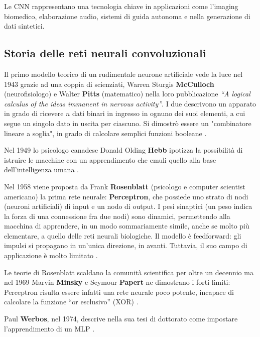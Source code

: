 Le CNN rappresentano una tecnologia chiave in applicazioni come l'imaging biomedico, elaborazione audio, sistemi di guida autonoma e nella generazione di dati sintetici.

\subsection{Storia delle reti neurali convoluzionali}
Il primo modello teorico di un rudimentale neurone artificiale vede la luce nel 1943 grazie ad una coppia di scienziati, Warren Sturgis \textbf{McCulloch} (neurofisiologo) e Walter \textbf{Pitts} (matematico) nella loro pubblicazione \textit{“A logical calculus of the ideas immanent in nervous activity”}. 
I due descrivono un apparato in grado di ricevere \(n\) dati binari in ingresso in ognuno dei suoi elementi, a cui segue un singolo dato in uscita per ciascuno. Si dimostrò essere un "combinatore lineare a soglia", in grado di calcolare semplici funzioni booleane \cite{ai4b_reti_neurali, ia_reti_neurali}.

Nel 1949 lo psicologo canadese Donald Olding \textbf{Hebb} ipotizza la possibilità di istruire le macchine con un apprendimento che emuli quello alla base dell’intelligenza umana \cite{ia_reti_neurali}.

Nel 1958 viene proposta da Frank \textbf{Rosenblatt} (psicologo e computer scientist americano) la prima rete neurale: \textbf{Perceptron}, che possiede uno strato di nodi (neuroni artificiali) di input e un nodo di output.
I pesi sinaptici (un peso indica la forza di una connessione fra due nodi) sono dinamici, permettendo alla macchina di apprendere, in un modo sommariamente simile, anche se molto più elementare, a quello delle reti neurali biologiche. Il modello è feedforward: gli impulsi si propagano in un’unica direzione, in avanti. Tuttavia, il suo campo di applicazione è molto limitato \cite{ia_reti_neurali, ai4b_reti_neurali}.

Le teorie di Rosenblatt scaldano la comunità scientifica per oltre un decennio ma nel 1969 Marvin \textbf{Minsky} e Seymour \textbf{Papert} ne dimostrano i forti limiti: Perceptron risulta essere infatti una rete neurale poco potente, incapace di calcolare la funzione “or esclusivo” (XOR) \cite{ai4b_reti_neurali, camastra_machine_2015}.

Paul \textbf{Werbos}, nel 1974, descrive nella sua tesi di dottorato come impostare l’apprendimento di un MLP \cite{ia_reti_neurali}.

